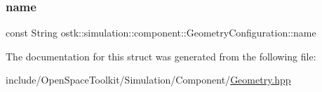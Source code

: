 \subsubsection{\texorpdfstring{name}{name}}
{\footnotesize\ttfamily const String ostk\+::simulation\+::component\+::\+Geometry\+Configuration\+::name}



The documentation for this struct was generated from the following file\+:\begin{DoxyCompactItemize}
\item 
include/\+Open\+Space\+Toolkit/\+Simulation/\+Component/\hyperlink{_geometry_8hpp}{Geometry.\+hpp}\end{DoxyCompactItemize}
